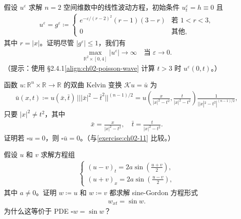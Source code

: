 \documentclass[../../main.tex]{subfiles}
\begin{document}
\begin{exercise}\label{exercise:ch12-二维爆破}
假设 $u^\varepsilon$ 求解 $n=2$ 空间维数中的线性波动方程，初始条件 $u_t^\varepsilon=h\equiv 0$ 且
\begin{align*}
u^\varepsilon=g^\varepsilon\coloneqq
\begin{cases}
e^{-\varepsilon/(r-2)^2}(r-1)(3-r) & \text{若 } 1<r<3,\\
0 & \text{其他},
\end{cases}
\end{align*}
其中 $r=|x|$。证明尽管 $|g^\varepsilon|\leqslant 1$，我们有
\begin{align*}
\max_{\mathbb{R}^2\times[0,4]}|u^\varepsilon|\to\infty \quad \text{当 } \varepsilon\to 0.
\end{align*}
（提示：使用 \S2.4.1\eqref{align:ch02-poisson-wave} 计算 $t>3$ 时 $u^\varepsilon(0,t)$。）
\end{exercise}

\begin{exercise}\label{exercise:ch12-Kelvin}函数 $u:\mathbb{R}^n\times\mathbb{R}\to\mathbb{R}$ 的双曲 Kelvin 变换 $\mathcal{K}u=\bar{u}$ 为
\begin{align*}
\bar{u}(x,t)\coloneqq u(\bar{x},\bar{t})\,|||\bar{x}|^2-\bar{t}^2||^{(n-1)/2}=u\left(\frac{x}{|x|^2-t^2},\frac{t}{|x|^2-t^2}\right)\frac{1}{||x|^2-t^2|^{(n-1)/2}},
\end{align*}
只要 $|x|^2\neq t^2$，其中
\begin{align*}
\bar{x}=\frac{x}{|x|^2-t^2},\quad\bar{t}=\frac{t}{|x|^2-t^2}.
\end{align*}
证明若 $\square u=0$，则 $\square\bar{u}=0$。（与\cref{exercise:ch02-11} 比较。）
\end{exercise}

\begin{exercise}\label{align:ch12-sineGordon}
假设 $u$ 和 $v$ 求解方程组
\begin{align*}
\begin{cases}
(u-v)_t=2a\sin\left(\frac{u+v}{2}\right),\\
(u+v)_x=2a\sin\left(\frac{u-v}{2}\right),
\end{cases}
\end{align*}
其中 $a\neq 0$。证明 $w\coloneqq u$ 和 $w\coloneqq v$ 都求解 sine-Gordon 方程形式
\begin{align*}
w_{xt}=\sin w.
\end{align*}
为什么这等价于 PDE $\square w=\sin w$？
\end{exercise}
\end{document}
